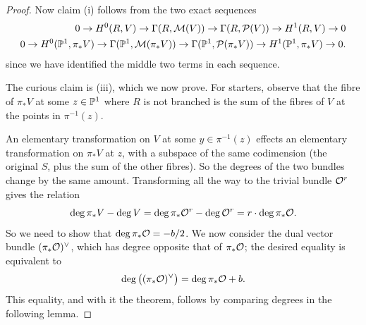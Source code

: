 \documentclass[12pt]{article}
\begin{document}
\begin{proof}
Now claim (i) follows from the two exact sequences
\begin{align*}
0 \to H^0(R,V)
\to \Gamma(R,\cM(V))
\to \Gamma(R,\cP(V))
\to H^1(R,V) \to 0 \\
0 \to H^0(\P^1,\pi_*V)
\to \Gamma(\P^1,\cM(\pi_*V))
\to \Gamma(\P^1,\cP(\pi_*V))
\to H^1(\P^1,\pi_*V) \to 0.
\end{align*}
since we have identified the middle two terms in each sequence. 


The curious claim is (iii), which we now prove. For starters, observe that the fibre of $\pi_*V$ at some $z\in\P^1$ where $R$ is not branched 
is the sum of the fibres of $V$ at the points in $\pi^{-1}(z)$.  

An elementary transformation on $V$ at some $y\in \pi^{-1}(z)$ effects an elementary 
transformation on $\pi_*V$ at $z$, with a subspace of the same codimension 
(the original $S$, plus the sum of the other fibres).  
So the degrees of the two bundles change by the same amount.  
Transforming all the way to the trivial bundle $\cO^r$ gives the relation
\[
\deg \pi_*V - \deg V
= \deg \pi_* \cO^r - \deg \cO^r
= r \cdot \deg \pi_* \cO.
\]
So we need to show that $\deg \pi_* \cO = -b/2$.  
We now consider the dual vector bundle $(\pi_* \cO)^\vee$, 
which has degree opposite that of $\pi_* \cO$; the desired equality is equivalent to
\[
\deg\big((\pi_* \cO)^\vee\big) = \deg \pi_* \cO + b.
\]
This equality, and with it the theorem, follows by comparing degrees in the following lemma.
\end{proof}
\end{document}
